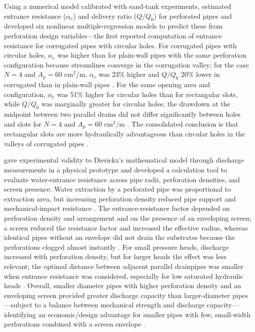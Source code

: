 \documentclass[11pt]{article}
\begin{document}
Using a numerical model calibrated with sand-tank experiments, \textcite{Gaj2020}
estimated entrance resistance ($\alpha_e$) and delivery ratio ($Q/Q_0$) for perforated
pipes and developed six nonlinear multiple-regression models to predict these from
perforation design variables---the first reported computation of entrance resistance for
corrugated pipes with circular holes. For corrugated pipes with circular holes, $\alpha_e$
was higher than for plain-wall pipes with the same perforation configuration because
streamlines converge in the corrugation valley; for the case $N=4$ and
$A_p = 60$ cm$^2$/m, $\alpha_e$ was 23\% higher and $Q/Q_0$ 20\% lower in corrugated than
in plain-wall pipes \parencite{Gaj2020}. For the same opening area and configuration,
$\alpha_e$ was 51\% higher for circular holes than for rectangular slots, while $Q/Q_0$
was marginally greater for circular holes; the drawdown at the midpoint between two
parallel drains did not differ significantly between holes and slots for $N=4$ and
$A_p = 60$ cm$^2$/m \parencite{Gaj2020}. The consolidated conclusion is that rectangular
slots are more hydraulically advantageous than circular holes in the valleys of corrugated
pipes \parencite{Gaj2020}.

\textcite{Oyarce2017} gave experimental validity to Dierickx's mathematical model through
discharge measurements in a physical prototype and developed a calculation tool to
evaluate water-entrance resistance across pipe radii, perforation densities, and screen
presence. Water extraction by a perforated pipe was proportional to extraction area, but
increasing perforation density reduced pipe support and mechanical-impact resistance
\parencite{Oyarce2017}. The entrance-resistance factor depended on perforation density and
arrangement and on the presence of an enveloping screen; a screen reduced the resistance
factor and increased the effective radius, whereas identical pipes without an envelope did
not drain the substrates because the perforations clogged almost instantly
\parencite{Oyarce2017}. For small pressure heads, discharge increased with perforation
density, but for larger heads the effect was less relevant; the optimal distance between
adjacent parallel drainpipes was smaller when entrance resistance was considered,
especially for low saturated hydraulic heads \parencite{Oyarce2017}. Overall, smaller
diameter pipes with higher perforation density and an enveloping screen provided greater
discharge capacity than larger-diameter pipes---subject to a balance between mechanical
strength and discharge capacity---identifying an economic/design advantage for smaller
pipes with few, small-width perforations combined with a screen envelope
\parencite{Oyarce2017}.
\end{document}
